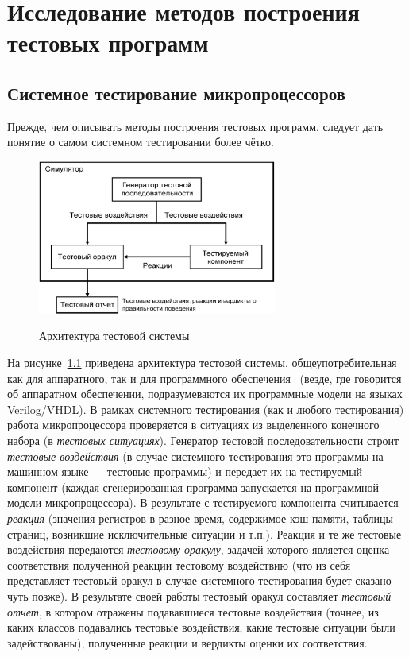 \chapter{Исследование методов построения тестовых программ}

\section{Системное тестирование микропроцессоров}

Прежде, чем описывать методы построения тестовых программ, следует дать понятие о самом системном тестировании более чётко.
\begin{figure}[h] \center
  \includegraphics[width=0.7\textwidth]{1.review/test-system}\\
  \caption{Архитектура тестовой системы}\label{fig:test_system}
\end{figure}

На рисунке~\ref{fig:test_system} приведена архитектура тестовой системы, общеупотребительная как для аппаратного, так и для программного обеспечения~\cite{IvanPreprint} (везде, где говорится об аппаратном обеспечении, подразумеваются их программные модели на языках Verilog/VHDL). В рамках системного тестирования (как и любого тестирования) работа микропроцессора проверяется в ситуациях из выделенного конечного набора (в \emph{тестовых ситуациях}). Генератор тестовой последовательности строит \emph{тестовые воздействия} (в случае системного тестирования это программы на машинном языке --- тестовые программы) и передает их на тестируемый компонент (каждая сгенерированная программа запускается на программной модели микропроцессора). В результате с тестируемого компонента считывается \emph{реакция} (значения регистров в разное время, содержимое кэш-памяти, таблицы страниц, возникшие исключительные ситуации и т.п.). Реакция и те же тестовые воздействия передаются \emph{тестовому оракулу}, задачей которого является оценка соответствия полученной реакции тестовому воздействию (что из себя представляет тестовый оракул в случае системного тестирования будет сказано чуть позже). В результате своей работы тестовый оракул составляет \emph{тестовый отчет}, в котором отражены подававшиеся тестовые воздействия (точнее, из каких классов подавались тестовые воздействия, какие тестовые ситуации были задействованы), полученные реакции и вердикты оценки их соответствия.

